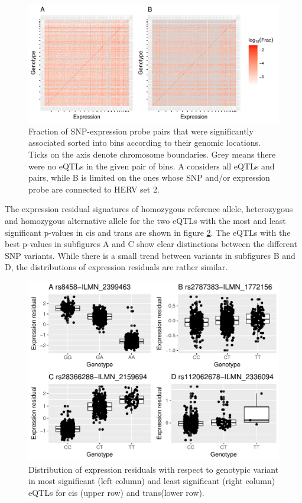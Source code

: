 \documentclass[a4paper,12pt,twoside,openright]{article}
\begin{document}
\begin{figure}[tb]
	\includegraphics[scale = 0.9, keepaspectratio = true]{../figures/eqtl_all_herv_heatmap}  
	\caption{Fraction of SNP-expression probe pairs that were significantly associated sorted into bins according to their genomic locations. Ticks on the axis denote chromosome boundaries. Grey means there were no eQTLs in the given pair of bins. A considers all eQTLs and pairs, while B is limited on the ones whose SNP and/or expression probe are connected to HERV set 2.}
    \label{fig:global.eqtl.heatmap}
\end{figure}

The expression residual signatures of homozygous reference allele, heterozygous and homozygous alternative allele for the two eQTLs with the most and least significant p-values in cis and trans are shown in figure \ref{fig:best.worst.eqtl.boxplot}. The eQTLs with the best p-values in subfigures A and C show clear distinctions between the different SNP variants. While there is a small trend between variants in subfigures B and D, the distributions of expression residuals are rather similar.    

\begin{figure}[tb]
	\includegraphics[scale = 1, keepaspectratio = true]{../figures/best_worst_eqtl_boxplots}  
	\caption{Distribution of expression residuals with respect to genotypic variant in most significant (left column) and least significant (right column) eQTLs for cis (upper row) and trans(lower row).}
    \label{fig:best.worst.eqtl.boxplot}
\end{figure}
\end{document}

